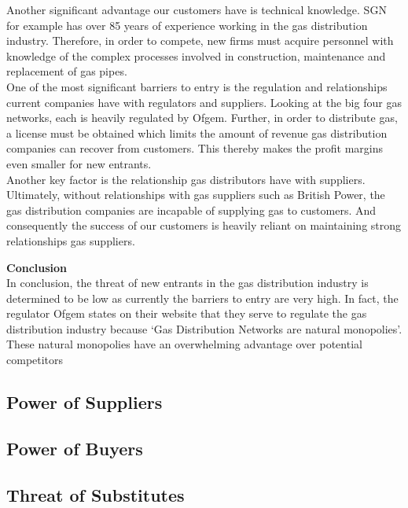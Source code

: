 \documentclass[11pt]{article}		%
\begin{document}
				Another significant advantage our customers have is technical knowledge. SGN for example has over 85 years of experience working in the gas distribution industry. Therefore, in order to compete, new firms must acquire personnel with knowledge of the complex processes involved in construction, maintenance and replacement of gas pipes. \\
				One of the most significant barriers to entry is the regulation and relationships current companies have with regulators and suppliers. Looking at the big four gas networks, each is heavily regulated by Ofgem. Further, in order to distribute gas, a license must be obtained which limits the amount of revenue gas distribution companies can recover from customers. This thereby makes the profit margins even smaller for new entrants. \\
	            \hspace*{3ex}Another key factor is the relationship gas distributors have with suppliers. Ultimately, without relationships with gas suppliers such as British Power, the gas distribution companies are incapable of supplying gas to customers. And consequently the success of our customers is heavily reliant on maintaining strong relationships gas suppliers.

			    \textbf{Conclusion}\\
                In conclusion, the threat of new entrants in the gas distribution industry is determined to be low as currently the barriers to entry are very high. In fact, the regulator Ofgem states on their website that they serve to regulate the gas distribution industry because ‘Gas Distribution Networks are natural monopolies’. These natural monopolies have an overwhelming advantage over potential competitors

		\subsection[Power of Suppliers]{Power of Suppliers}
		
		\subsection[Power of Buyers]{Power of Buyers}
		
		\subsection[Threat of Substitutes]{Threat of Substitutes}
\end{document}

